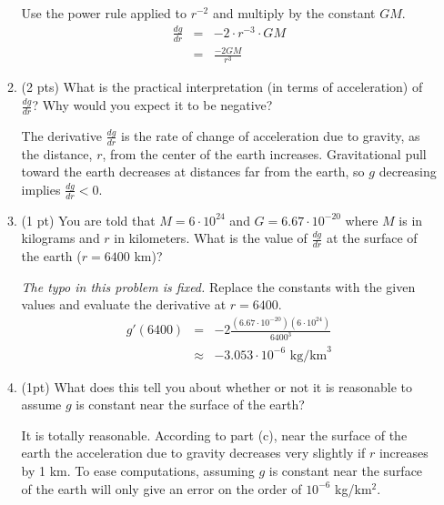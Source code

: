 \documentclass[11pt,letterpaper]{article}
\begin{document}
\begin{enumerate}
\begin{enumerate}
\vspace{.5pc}
Use the power rule applied to $r^{-2}$ and multiply by the constant $GM$.
\begin{eqnarray*}
\frac{dg}{dr} &=& -2\cdot r^{-3}\cdot GM \\
&=& \frac{-2GM}{r^3}
\end{eqnarray*}

\vspace{.5pc}
\item (2 pts) What is the practical interpretation (in terms of acceleration) of
$\frac{dg}{dr}$?  Why would you expect it to be negative?

\vspace{.5pc}
The derivative $\frac{dg}{dr}$ is the rate of change of acceleration due to gravity, as the distance, $r$, from the center of the earth increases.  Gravitational pull toward the earth decreases at distances far from the earth, so $g$ decreasing implies $\frac{dg}{dr}<0$.

\vspace{.5pc}
\item (1 pt) You are told that $M=6\cdot 10^{24}$ and $G=6.67\cdot 10^{-20}$
where $M$ is in kilograms and $r$ in kilometers.  What is the value of
$\frac{dg}{dr}$ at the surface of the earth ($r=6400$ km)?

\vspace{.5pc}\textit{The typo in this problem is fixed.}
\linebreak
Replace the constants with the given values and evaluate the derivative at $r=6400$.
\begin{eqnarray*}
 g'(6400) &=& -2\frac{(6.67\cdot 10^{-20})(6\cdot 10^{24})}{6400^3} \\
&\approx & -3.053\cdot 10^{-6} \text{ kg/km}^3
\end{eqnarray*}

\vspace{.5pc}
\item (1pt) What does this tell you about whether or not it is reasonable to
assume $g$ is constant near the surface of the earth?

\vspace{.5pc}
It is totally reasonable.  According to part (c), near the surface of the earth the acceleration due to gravity decreases very slightly if $r$ increases by 1 km. To ease computations, assuming $g$ is constant near the surface of the earth will only give an error on the order of $10^{-6}$ kg/km$^2$. 
\end{enumerate}
 

\end{enumerate}
\end{document}
